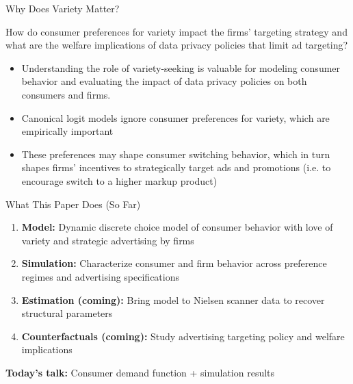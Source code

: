 \documentclass[aspectratio=169,professionalfonts]{beamer}
\newcommand{\hl}[1]{\textbf{\textcolor{UGARed}{#1}}}
\begin{document}
\begin{frame}{Why Does Variety Matter?}
  \begin{tcolorbox}[colback=red!5!white, colframe=UGARed, title=\textbf{Research Question}]
    How do consumer preferences for variety impact the firms' targeting strategy and what are the welfare implications of data privacy policies that limit ad targeting?
  \end{tcolorbox}
  \begin{itemize}
    \item Understanding the role of variety-seeking is valuable for modeling consumer behavior and evaluating the impact of data privacy policies on both consumers and firms.
    \item Canonical logit models ignore consumer preferences for variety, which are
          empirically important 
    \item These preferences may shape consumer switching behavior, which in turn
          shapes firms' incentives to strategically target ads and promotions (i.e. to encourage switch to a higher markup product)
  \end{itemize}
\end{frame}

\begin{frame}{What This Paper Does (So Far)}
  \begin{enumerate}
    \item \hl{Model:} Dynamic discrete choice model of consumer behavior with love of variety and strategic advertising by firms
    \vspace{4pt}
    \item \hl{Simulation:} Characterize consumer and firm behavior
          across preference regimes and advertising
          specifications
    \vspace{4pt}
    \item \hl{Estimation (coming):} Bring model to Nielsen scanner data
          to recover structural parameters
    \vspace{4pt}
    \item \hl{Counterfactuals (coming):} Study advertising targeting policy and
          welfare implications
  \end{enumerate}
  \vspace{6pt}
  \textbf{Today's talk:} Consumer demand function + simulation results
\end{frame}
\end{document}
